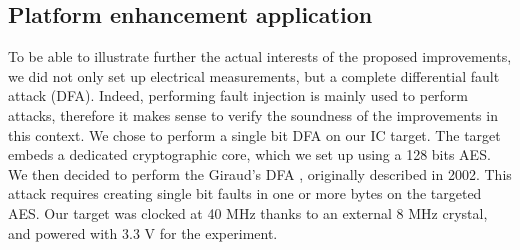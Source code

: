 	\subsection{Platform enhancement application}
		To be able to illustrate further the actual interests of the proposed improvements, we did not only set up electrical measurements, but a complete differential fault attack (DFA).
		Indeed, performing fault injection is mainly used to perform attacks, therefore it makes sense to verify the soundness of the improvements in this context.
		We chose to perform a single bit DFA on our IC target.
		The target embeds a dedicated cryptographic core, which we set up using a 128 bits AES.
		We then decided to perform the Giraud's DFA \cite{giraudDfa}, originally described in 2002.
		This attack requires creating single bit faults in one or more bytes on the targeted AES.
		Our target was clocked at 40 MHz thanks to an external 8 MHz crystal, and powered with 3.3 V for the experiment.

